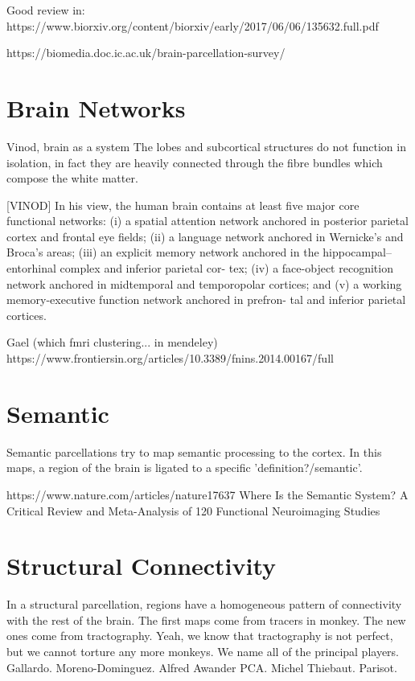 Good review in:
https://www.biorxiv.org/content/biorxiv/early/2017/06/06/135632.full.pdf

https://biomedia.doc.ic.ac.uk/brain-parcellation-survey/

\section{Brain Networks}
Vinod, brain as a system
The lobes and subcortical structures do not function in isolation, in fact they are heavily connected through the fibre bundles which compose the white matter.

[VINOD]
In his view, the human brain contains at least five major core functional networks: (i) a spatial attention network anchored in posterior parietal cortex and frontal eye fields;
(ii) a language network anchored in Wernicke’s and Broca’s areas; (iii) an explicit memory network anchored in the hippocampal–entorhinal complex and inferior parietal cor- tex; (iv) a face-object recognition network anchored in
midtemporal and temporopolar cortices; and (v) a working memory-executive function network anchored in prefron- tal and inferior parietal cortices. 


Gael (which fmri clustering... in mendeley)
https://www.frontiersin.org/articles/10.3389/fnins.2014.00167/full

\section{Semantic}
Semantic parcellations try to map semantic processing to the cortex.
In this maps, a region of the brain is ligated to a specific 'definition?/semantic'.

https://www.nature.com/articles/nature17637
Where Is the Semantic System? A Critical Review and Meta-Analysis of 120 Functional Neuroimaging Studies

\section{Structural Connectivity}
In a structural parcellation, regions have a homogeneous pattern of connectivity
with the rest of the brain. The first maps come from tracers in monkey. The new
ones come from tractography. Yeah, we know that tractography is not perfect,
but we cannot torture any more monkeys. We name all of the principal players.
Gallardo.
Moreno-Dominguez.
Alfred Awander PCA.
Michel Thiebaut.
Parisot.

